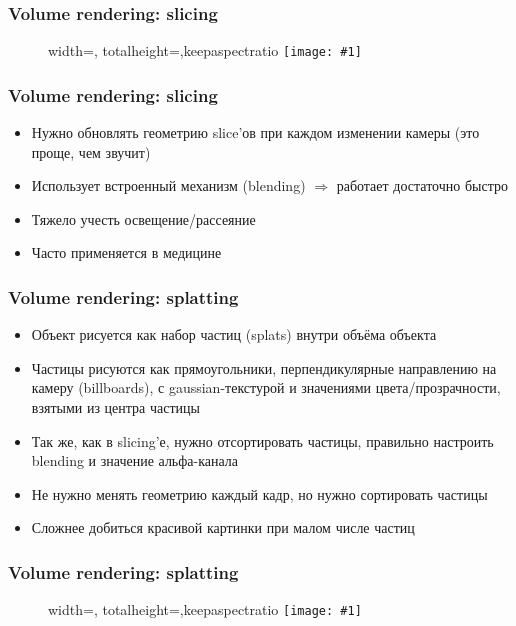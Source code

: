 \documentclass[10pt]{beamer}
\newcommand{\slideimage}[1]{
  \begin{figure}
    \begin{adjustbox}{width=\textwidth, totalheight=\textheight-2\baselineskip-2\baselineskip,keepaspectratio}
      \texttt{[image: \#1]}
    \end{adjustbox}
  \end{figure}
}
\begin{document}
\begin{frame}[fragile]
\frametitle{Volume rendering: slicing}
\slideimage{slicing.jpg}
\end{frame}

\begin{frame}[fragile]
\frametitle{Volume rendering: slicing}
\begin{itemize}
\item Нужно обновлять геометрию slice'ов при каждом изменении камеры \pause (это проще, чем звучит)
\pause
\item Использует встроенный механизм (blending) \begin{math}\Longrightarrow\end{math} работает достаточно быстро
\pause
\item Тяжело учесть освещение/рассеяние
\pause
\item Часто применяется в медицине
\end{itemize}
\end{frame}

\begin{frame}[fragile]
\frametitle{Volume rendering: splatting}
\begin{itemize}
\item Объект рисуется как набор частиц (splats) внутри объёма объекта
\pause
\item Частицы рисуются как прямоугольники, перпендикулярные направлению на камеру (billboards), с gaussian-текстурой и значениями цвета/прозрачности, взятыми из центра частицы
\pause
\item Так же, как в slicing'е, нужно отсортировать частицы, правильно настроить blending и значение альфа-канала
\pause
\item Не нужно менять геометрию каждый кадр, но нужно сортировать частицы
\pause
\item Сложнее добиться красивой картинки при малом числе частиц
\end{itemize}
\end{frame}

\begin{frame}[fragile]
\frametitle{Volume rendering: splatting}
\slideimage{splatting-scheme.png}
\end{frame}
\end{document}
